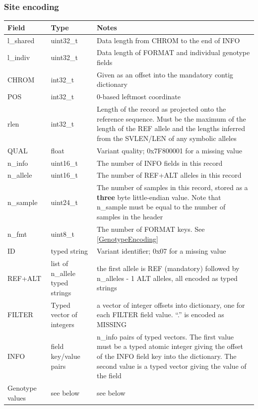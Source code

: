 \documentclass[8pt]{article}
\begin{document}
\subsubsection{Site encoding}
\label{BcfSiteEncoding}

{\small
\begin{tabular}{|l | l | p{30em} | } \hline
\textbf{Field} &	\textbf{Type} &	\textbf{Notes} \\ \hline
l\_shared & uint32\_t & Data length from CHROM to the end of INFO \\ \hline
l\_indiv  & uint32\_t & Data length of FORMAT and individual genotype fields \\ \hline
CHROM     & int32\_t  & Given as an offset into the mandatory contig dictionary \\ \hline
POS       & int32\_t  & 0-based leftmost coordinate \\ \hline
rlen      & int32\_t  & Length of the record as projected onto the reference sequence.
                        Must be the maximum of the length of the REF allele and the lengths
                        inferred from the SVLEN/LEN of any symbolic alleles \\ \hline
QUAL      & float     & Variant quality; 0x7F800001 for a missing value \\ \hline
n\_info   & uint16\_t & The number of INFO fields in this record \\ \hline
n\_allele & uint16\_t & The number of REF+ALT alleles in this record \\ \hline
n\_sample & uint24\_t & The number of samples in this record, stored as a \textbf{three} byte little-endian value.
                        Note that n\_sample must be equal to the number of samples in the header \\ \hline
n\_fmt    & uint8\_t  & The number of FORMAT keys.  See \ref{GenotypeEncoding} \\ \hline
ID       & typed string & Variant identifier; 0x07 for a missing value \\ \hline
REF+ALT  & list of n\_allele typed strings & the first allele is REF (mandatory) followed by n\_alleles - 1 ALT
                                             alleles, all encoded as typed strings \\ \hline
FILTER   & Typed vector of integers & a vector of integer offsets into dictionary, one for each FILTER field value.
                                      ``.'' is encoded as MISSING \\ \hline
INFO     & field key/value pairs & n\_info pairs of typed vectors.
                                   The first value must be a typed atomic integer giving the offset of the INFO field
                                   key into the dictionary.
                                   The second value is a typed vector giving the value of the field \\ \hline
Genotype values & see below & see below \\ \hline
\end{tabular}}
\end{document}
